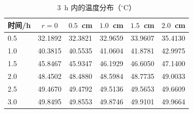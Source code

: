 \begin{table}[H]
  \centering
  \caption{$3$~h 内的温度分布（$^\circ$C）}
  \label{tab:table3_q2_temperature}
  \small
  \begin{tabular}{lccccc}
    \toprule
    时间/h & $r=0$ & $0.5$~cm & $1.0$~cm & $1.5$~cm & $2.0$~cm \\
    \midrule
    0.5 & 32.1892 & 32.3821 & 32.9659 & 33.9607 & 35.4130 \\
    1.0 & 40.3815 & 40.5535 & 41.0604 & 41.8781 & 42.9975 \\
    1.5 & 45.8467 & 45.9347 & 46.1929 & 46.6050 & 47.1400 \\
    2.0 & 48.4502 & 48.4880 & 48.5984 & 48.7735 & 49.0033 \\
    2.5 & 49.4670 & 49.4792 & 49.5136 & 49.5653 & 49.6609 \\
    3.0 & 49.8495 & 49.8553 & 49.8746 & 49.9101 & 49.9664 \\
    \bottomrule
  \end{tabular}
\end{table}
